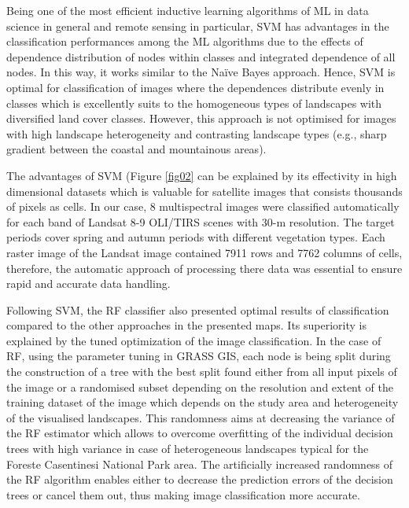 \documentclass[eprint,
approc,		%
]{actapoly}
\begin{document}
Being one of the most efficient inductive learning algorithms of ML in data science in general and remote sensing in particular, SVM has advantages in the classification performances among the ML algorithms due to the effects of dependence distribution of nodes within classes and integrated dependence of all nodes. In this way, it works similar to the Naïve Bayes approach. Hence, SVM is optimal for classification of images where the dependences distribute evenly in classes which is excellently suits to the homogeneous types of landscapes with diversified land cover classes. However, this approach is not optimised for images with high landscape heterogeneity and contrasting landscape types (e.g., sharp gradient between the coastal and mountainous areas).

The advantages of SVM (Figure \ref{fig02} can be explained by its effectivity in high dimensional datasets which is valuable for satellite images that consists thousands of pixels as cells. In our case, 8 multispectral images were classified automatically for each band of Landsat 8-9 OLI/TIRS scenes with 30-m resolution. The target periods cover spring and autumn periods with different vegetation types. Each raster image of the Landsat image contained 7911 rows and 7762 columns of cells, therefore, the automatic approach of processing there data was essential to ensure rapid and accurate data handling. 

Following SVM, the RF classifier also presented optimal results of classification compared to the other approaches in the presented maps. Its superiority is explained by the tuned optimization of the image classification. In the case of RF, using the parameter tuning in GRASS GIS, each node is being split during the construction of a tree with the best split found either from all input pixels of the image or a randomised subset depending on the resolution and extent of the training dataset of the image which depends on the study area and heterogeneity of the visualised landscapes. This randomness aims at decreasing the variance of the RF estimator which allows to overcome overfitting of the individual decision trees with high variance in case of heterogeneous landscapes typical for the Foreste Casentinesi National Park area. The artificially increased randomness of the RF algorithm enables either to decrease the prediction errors of the decision trees or cancel them out, thus making image classification more accurate. 
\end{document}

